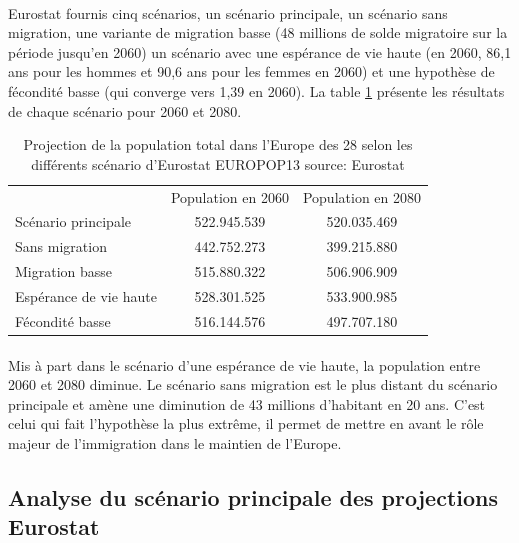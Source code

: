 \paragraph{}Eurostat fournis cinq scénarios, un scénario principale, un scénario sans migration, une variante de migration basse (48 millions de solde migratoire sur la période jusqu’en 2060)  un scénario avec une espérance de vie haute (en 2060, 86,1 ans pour les hommes et 90,6 ans pour les femmes en 2060) et une hypothèse de fécondité basse (qui converge vers 1,39 en 2060). La table \ref{projection_scenario} présente les résultats de chaque scénario pour 2060 et 2080.

\begin{table}
  \caption{Projection de la population total dans l'Europe des 28 selon les différents scénario d'Eurostat EUROPOP13 source: Eurostat\citep{eurostat_europop13}}
  \label{projection_scenario}

  \begin{center}
    \begin{tabular}{lcc}
       & Population en 2060 & Population en 2080\\
      Scénario principale & 522.945.539 & 520.035.469\\
      Sans migration & 442.752.273 & 399.215.880 \\
      Migration basse & 515.880.322 & 506.906.909 \\
      Espérance de vie haute & 528.301.525 & 533.900.985 \\
      Fécondité basse & 516.144.576 & 497.707.180 \\
    \end{tabular}
  \end{center}
\end{table}

\paragraph{}Mis à part dans le scénario d’une espérance de vie haute, la population entre 2060 et 2080 diminue. Le scénario sans migration est le plus distant du scénario principale et amène une diminution de 43 millions d’habitant en 20 ans. C’est celui qui fait l’hypothèse la plus extrême, il permet de mettre en avant le rôle majeur de l’immigration dans le maintien de l’Europe.


\subsection{Analyse du scénario principale des projections Eurostat}
